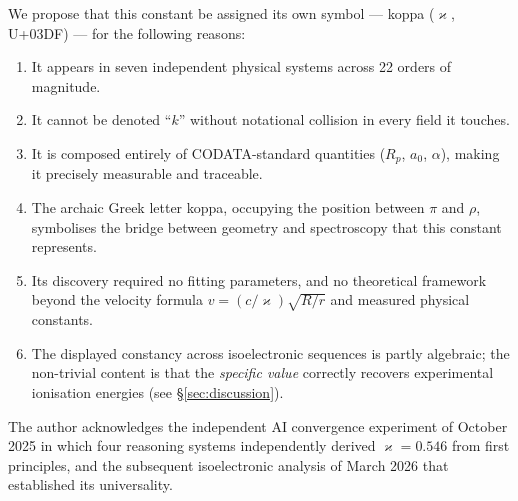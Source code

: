 \documentclass[twocolumn,epjc3]{svjour3}
\newcommand{\kop}{\varkappa}  %
\begin{document}
We propose that this constant be assigned its own symbol --- koppa ($\kop$, U+03DF) --- for the following reasons:
\begin{enumerate}
  \item It appears in seven independent physical systems across 22 orders of magnitude.
  \item It cannot be denoted ``$k$'' without notational collision in every field it touches.
  \item It is composed entirely of CODATA-standard quantities ($R_p$, $a_0$, $\alpha$), making it precisely measurable and traceable.
  \item The archaic Greek letter koppa, occupying the position between $\pi$ and $\rho$, symbolises the bridge between geometry and spectroscopy that this constant represents.
  \item Its discovery required no fitting parameters, and no theoretical framework beyond the velocity formula $v = (c/\kop)\sqrt{R/r}$ and measured physical constants.
  \item The displayed constancy across isoelectronic sequences is partly algebraic; the non-trivial content is that the \emph{specific value} correctly recovers experimental ionisation energies (see \S\ref{sec:discussion}).
\end{enumerate}

\begin{acknowledgements}
The author acknowledges the independent AI convergence experiment of October 2025 in which four reasoning systems independently derived $\kop = 0.546$ from first principles, and the subsequent isoelectronic analysis of March 2026 that established its universality.
\end{acknowledgements}


\end{document}
